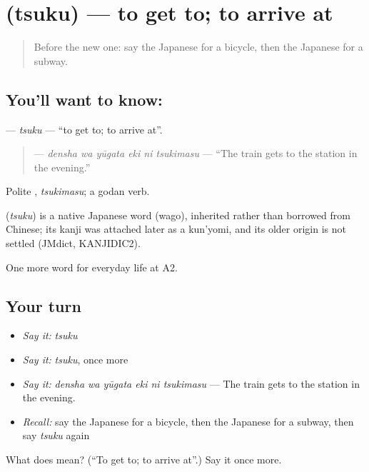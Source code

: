 \section[\texorpdfstring{\ja{つく} (tsuku)}{つく (tsuku)}]{ (tsuku) — to get to; to arrive at}

\label{lesson:JA-C198-tsuku}



\begin{quote}
Before the new one: say the Japanese for a bicycle, then the Japanese for a subway.
\end{quote}

\subsection*{You'll want to know: }
\textbf{} — \emph{tsuku} — \textquotedblleft{}to get to; to arrive at\textquotedblright{}.

\begin{quote}
\textbf{   } — \emph{densha wa yūgata eki ni tsukimasu} — \textquotedblleft{}The train gets to the station in the evening.\textquotedblright{}
\end{quote}

Polite \textbf{}, \emph{tsukimasu}; a godan verb.

\begin{cousinweb}
\textbf{} (\emph{tsuku}) is a native Japanese word (wago), inherited rather than borrowed from Chinese; its kanji was attached later as a kun'yomi, and its older origin is not settled (JMdict, KANJIDIC2).
\end{cousinweb}

\begin{grammarlens}[title={What you've built}]
One more word for everyday life at A2.
\end{grammarlens}

\subsection*{Your turn}
\begin{itemize}
\raggedright
  \item \emph{Say it:} \emph{tsuku}
  \item \emph{Say it:} \emph{tsuku}, once more
  \item \emph{Say it:} \emph{densha wa yūgata eki ni tsukimasu} — The train gets to the station in the evening.
  \item \emph{Recall:} say the Japanese for a bicycle, then the Japanese for a subway, then say \emph{tsuku} again
\end{itemize}

\begin{tcolorbox}[breakable,colback=teal!4,colframe=teal!35!black,title={Before you move on}]
What does  mean? (\textquotedblleft{}To get to; to arrive at\textquotedblright{}.) Say it once more.
\end{tcolorbox}
